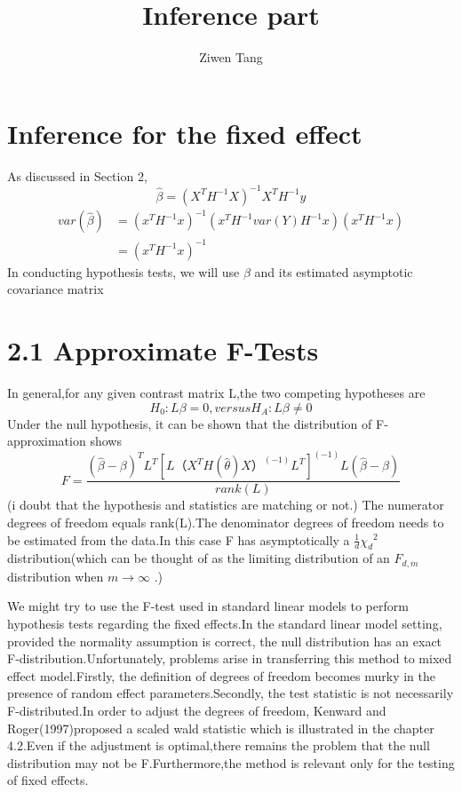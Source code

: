 \documentclass[a4paper,11pt]{article}
\begin{document}
  
\title{Inference part}
\author{Ziwen Tang}
\maketitle


\section{Inference for the fixed effect}

As discussed in Section 2,
\begin{equation}\label{eq:4} 
         \widehat{\beta} = (X^T H^{-1} X)^{-1} X^T H^{-1} y
\end{equation}
\begin{equation}\label{eq:7} 
  \begin{split}
    var(\widehat{\beta}) &= (x^T H^{-1} x)^{-1}(x^T H^{-1} var(Y) H^{-1} x)(x^T H^{-1} x)\\
                         &=(x^T H^{-1} x)^{-1}
  \end{split}
\end{equation}
In conducting hypothesis tests, we will use $\beta$ and its estimated asymptotic covariance matrix

\section{2.1 Approximate F-Tests}
In general,for any given contrast matrix L,the two competing hypotheses are
\begin{equation}\label{eq:8} 
         H_0 : L\beta = 0, versus H_A: L\beta \neq 0
\end{equation}
Under the null hypothesis, it can be shown that  the distribution of F-approximation shows
\begin{equation}\label{eq:9}
F = \frac{(\widehat{\beta}-\beta)^T L^T [L（X^T H(\widehat{\theta}) X）^(-1) L^T]^(-1) L(\widehat{\beta}-\beta)}{rank(L)}
\end{equation}
(i doubt that the hypothesis and statistics are matching or not.)
The numerator degrees of freedom equals rank(L).The denominator degrees of freedom needs to be estimated from the data.In this case F has asymptotically a $\frac{1}{d}{\chi_d}^2$distribution(which can be thought of as the limiting distribution of an $F_{d,m}$distribution when  $m \to \infty$ .)

We might try to use the F-test used in standard linear models to perform hypothesis tests regarding the fixed effects.In the standard linear model setting, provided the normality assumption is correct, the null distribution has an exact F-distribution.Unfortunately, problems arise in transferring this method to mixed effect model.Firstly, the definition of degrees of freedom becomes murky in the presence of random effect parameters.Secondly, the test statistic is not necessarily F-distributed.In order to adjust the degrees of freedom, Kenward and Roger(1997)proposed a scaled wald statistic which is illustrated in the chapter 4.2.Even if the adjustment is optimal,there remains the problem that the null distribution may not be F.Furthermore,the method is relevant only for the testing of fixed effects.
\end{document}
